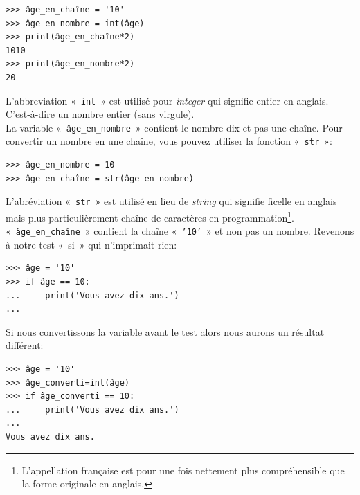 \begin{Verbatim}[frame=single,rulecolor=\color{mbleu}, label=à taper]
>>> âge_en_chaîne = '10'
>>> âge_en_nombre = int(âge)
>>> print(âge_en_chaîne*2)
1010
>>> print(âge_en_nombre*2)
20
\end{Verbatim}

L'abbreviation «~\texttt{int}~»  est utilisé  pour \emph{integer} qui signifie entier en anglais. C'est-à-dire un nombre entier (sans virgule).\\

La variable «~\texttt{âge\_en\_nombre}~» contient le nombre dix et pas une chaîne. Pour convertir un nombre en une chaîne, vous pouvez utiliser la fonction «~\texttt{str}~»:

\begin{Verbatim}[frame=single,rulecolor=\color{mbleu}, label=à taper]
>>> âge_en_nombre = 10
>>> âge_en_chaîne = str(âge_en_nombre)
\end{Verbatim}

L'abréviation «~\texttt{str}~» est utilisé en lieu de \emph{string} qui signifie ficelle en anglais mais plus particulièrement chaîne de caractères en programmation\footnote{L'appellation française est pour une fois nettement plus compréhensible que la forme originale en anglais.}.\\

«~\texttt{âge\_en\_chaîne}~» contient la chaîne «~\texttt{'10'}~» et non pas un nombre. Revenons à notre test «~si~» qui n'imprimait rien:

\begin{Verbatim}[frame=single,rulecolor=\color{green}, label=à taper avec attention]
>>> âge = '10'
>>> if âge == 10:
...     print('Vous avez dix ans.')
...
\end{Verbatim}

Si nous convertissons la variable avant le test alors nous aurons un résultat différent:

\begin{Verbatim}[frame=single,rulecolor=\color{green}, label=à taper avec attention]
>>> âge = '10'
>>> âge_converti=int(âge)
>>> if âge_converti == 10:
...     print('Vous avez dix ans.')
...
Vous avez dix ans.
\end{Verbatim}



\clearemptydoublepage